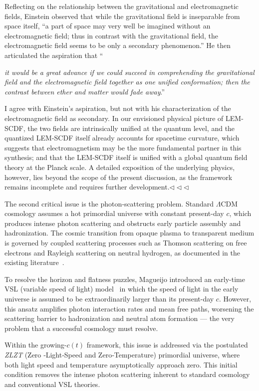 \documentclass[12pt,leqno]{article}
\begin{document}
	Reflecting on the relationship between the gravitational and electromagnetic fields, Einstein observed that while the gravitational field is inseparable from space itself, ``a part of space may very well be imagined without an electromagnetic field; thus in contrast with the gravitational field, the electromagnetic field seems to be only a secondary phenomenon.'' He then articulated the aspiration that ``{\textit{it would be a great advance if we could succeed in comprehending the gravitational field and the electromagnetic field together as one unified conformation; then the contrast between ether and matter would fade away}.''
		
	\medskip
	I agree with Einstein's aspiration, but not with his characterization of the electromagnetic field as secondary. In our envisioned physical picture of LEM-SCDF, the two fields are intrinsically unified at the quantum level, and the quantized LEM-SCDF itself already accounts for spacetime curvature, which suggests that electromagnetism may be the more fundamental partner in this synthesis; and that the LEM-SCDF itself is unified with a global quantum field theory at the Planck scale. A detailed exposition of the underlying physics, however, lies beyond the scope of the present discussion, as the framework remains incomplete and requires further development.\enspace$\triangleleft \triangleleft \triangleleft$
	

	\bigskip
	The second critical issue is the photon‑scattering problem. Standard \(\Lambda\)CDM cosmology assumes a hot primordial universe with constant present-day \(c\), which produces intense photon scattering and obstructs early particle assembly and hadronization. The cosmic transition from opaque plasma to transparent medium is governed by coupled scattering processes such as Thomson scattering on free electrons and Rayleigh scattering on neutral hydrogen, as documented in the existing literature~\cite{Coulton:2021}.
	
	\medskip
	To resolve the horizon and flatness puzzles, Magueijo introduced an early-time VSL (variable speed of light) model~\cite{Magueijo:2003} in which the speed of light in the early universe is assumed to be extraordinarily larger than its present-day \(c\). However, this ansatz amplifies photon interaction rates and mean free paths, worsening the scattering barrier to hadronization and neutral atom formation — the very problem that a successful cosmology must resolve.
			
	\medskip
	Within the growing-\(c(t)\) framework, this issue is addressed via the postulated \textit{ZLZT} (Zero ‑Light‑Speed and Zero‑Temperature) primordial universe, where both light speed and temperature asymptotically approach zero. This initial condition removes the intense photon scattering inherent to standard cosmology and conventional VSL theories.
		
}
\end{document}
